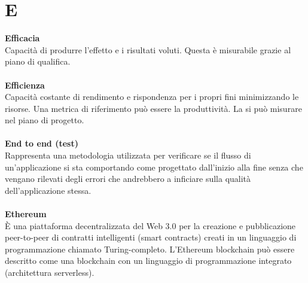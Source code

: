 \section{E}
\textbf{Efficacia}\\
Capacità di produrre l'effetto e i risultati voluti. Questa è misurabile grazie al piano di qualifica. \\ \\
\textbf{Efficienza}\\
Capacità costante di rendimento e rispondenza per i propri fini minimizzando le risorse. Una metrica di riferimento può essere la  produttività. La si può misurare nel piano di progetto. \\ \\
\textbf{End to end (test)}\\
Rappresenta una metodologia utilizzata per verificare se il flusso di un'applicazione si sta comportando come progettato dall'inizio alla fine senza che vengano rilevati degli errori che andrebbero a inficiare sulla qualità dell’applicazione stessa. \\ \\
\textbf{Ethereum}\\
È una piattaforma decentralizzata del Web 3.0 per la creazione e pubblicazione peer-to-peer di contratti intelligenti (smart contracts) creati in un linguaggio di programmazione chiamato Turing-completo. L'Ethereum blockchain può essere descritto come una blockchain con un linguaggio di programmazione integrato (architettura serverless). \\ \\
\clearpage